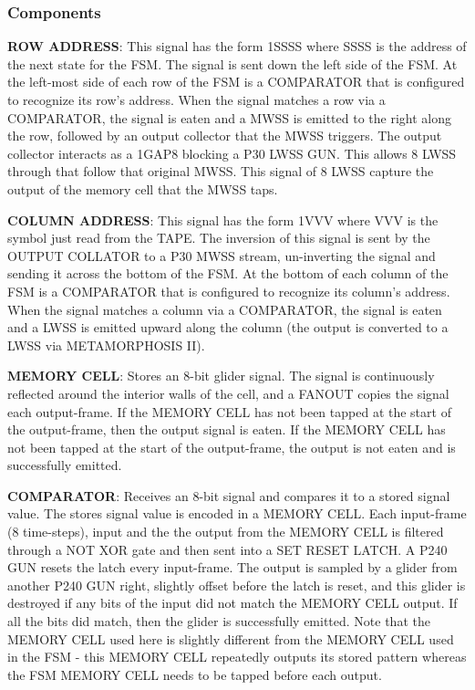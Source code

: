 \documentclass{article}
\begin{document}
\subsubsection{Components}
\noindent\textbf{ROW ADDRESS}: This signal has the form 1SSSS where SSSS is the address of the next state for the FSM. The signal is sent down the left side of the FSM. At the left-most side of each row of the FSM is a COMPARATOR that is configured to recognize its row's address. When the signal matches a row via a COMPARATOR, the signal is eaten and a MWSS is emitted to the right along the row, followed by an output collector that the MWSS triggers. The output collector interacts as a 1GAP8 blocking a P30 LWSS GUN. This allows 8 LWSS through that follow that original MWSS. This signal of 8 LWSS capture the output of the memory cell that the MWSS taps.

\vspace{1em}

\noindent\textbf{COLUMN ADDRESS}: This signal has the form 1VVV where VVV is the symbol just read from the TAPE. The inversion of this signal is sent by the OUTPUT COLLATOR to a P30 MWSS stream, un-inverting the signal and sending it across the bottom of the FSM. At the bottom of each column of the FSM is a COMPARATOR that is configured to recognize its column's address. When the signal matches a column via a COMPARATOR, the signal is eaten and a LWSS is emitted upward along the column (the output is converted to a LWSS via METAMORPHOSIS II).

\vspace{1em}

\noindent\textbf{MEMORY CELL}: Stores an 8-bit glider signal. The signal is continuously reflected around the interior walls of the cell, and a FANOUT copies the signal each output-frame. If the MEMORY CELL has not been tapped at the start of the output-frame, then the output signal is eaten. If the MEMORY CELL has not been tapped at the start of the output-frame, the output is not eaten and is successfully emitted.

\vspace{1em}

\noindent\textbf{COMPARATOR}: Receives an 8-bit signal and compares it to a stored signal value. The stores signal value is encoded in a MEMORY CELL. Each input-frame (8 time-steps), input and the the output from the MEMORY CELL is filtered through a NOT XOR gate and then sent into a SET RESET LATCH. A P240 GUN resets the latch every input-frame. The output is sampled by a glider from another P240 GUN right, slightly offset before the latch is reset, and this glider is destroyed if any bits of the input did not match the MEMORY CELL output. If all the bits did match, then the glider is successfully emitted. Note that the MEMORY CELL used here is slightly different from the MEMORY CELL used in the FSM - this MEMORY CELL repeatedly outputs its stored pattern whereas the FSM MEMORY CELL needs to be tapped before each output.
\end{document}
